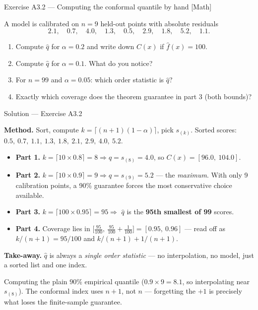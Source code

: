 \documentclass[aspectratio=169,11pt]{beamer}
\begin{document}
\begin{frame}{Exercise A3.2 --- Computing the conformal quantile by hand [Math]}
\begin{exercise}
  A model is calibrated on $n = 9$ held-out points with absolute residuals
  \[
    2.1,\quad 0.7,\quad 4.0,\quad 1.3,\quad 0.5,\quad 2.9,\quad 1.8,\quad 5.2,\quad 1.1 .
  \]
  \begin{enumerate}
    \item Compute $\hat q$ for $\alpha = 0.2$ and write down $C(x)$ if
          $\hat f(x) = 100$.
    \item Compute $\hat q$ for $\alpha = 0.1$. What do you notice?
    \item For $n = 99$ and $\alpha = 0.05$: which order statistic is $\hat q$?
    \item Exactly which coverage does the theorem guarantee in part 3
          (both bounds)?
  \end{enumerate}
\end{exercise}
\end{frame}

\begin{frame}{Solution --- Exercise A3.2}
\begin{solutionbox}
  \textbf{Method.} Sort, compute $k = \lceil (n+1)(1-\alpha) \rceil$, pick $s_{(k)}$.
  Sorted scores: $0.5,\ 0.7,\ 1.1,\ 1.3,\ 1.8,\ 2.1,\ 2.9,\ 4.0,\ 5.2$.
  \begin{itemize}
    \item \textbf{Part 1.} $k = \lceil 10 \times 0.8 \rceil = 8 \Rightarrow
          \hat q = s_{(8)} = 4.0$, so $C(x) = [96.0,\ 104.0]$.
    \item \textbf{Part 2.} $k = \lceil 10 \times 0.9 \rceil = 9 \Rightarrow
          \hat q = s_{(9)} = 5.2$ --- the \emph{maximum}. With only 9 calibration
          points, a 90\% guarantee forces the most conservative choice available.
    \item \textbf{Part 3.} $k = \lceil 100 \times 0.95 \rceil = 95 \Rightarrow$
          $\hat q$ is the \textbf{95th smallest of 99} scores.
    \item \textbf{Part 4.} Coverage lies in
          $\big[\tfrac{95}{100},\ \tfrac{95}{100} + \tfrac{1}{100}\big] = [0.95,\ 0.96]$
          --- read off as $k/(n+1) = 95/100$ and $k/(n+1) + 1/(n+1)$.
  \end{itemize}
  \textbf{Take-away.} $\hat q$ is always a \emph{single order statistic} --- no
  interpolation, no model, just a sorted list and one index.
\end{solutionbox}
\begin{mistake}
  Computing the plain $90\%$ empirical quantile ($0.9 \times 9 = 8.1$, so interpolating
  near $s_{(8)}$). The conformal index uses $n + 1$, not $n$ --- forgetting the $+1$
  is precisely what loses the finite-sample guarantee.
\end{mistake}
\end{frame}
\end{document}
